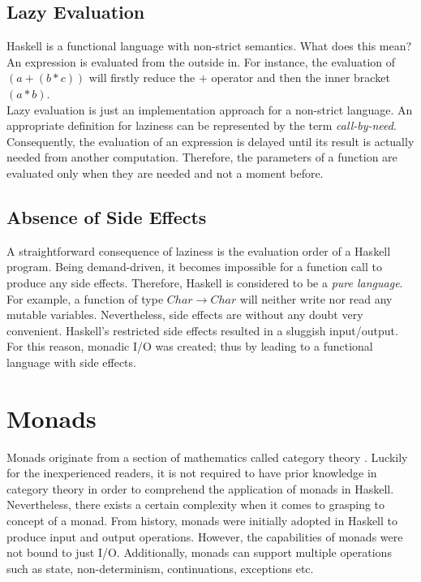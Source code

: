 \documentclass[a4paper, onecolumn]{article}
\begin{document}
    \subsection{Lazy Evaluation}
    
    Haskell is a functional language with non-strict semantics. What does this mean? An expression is evaluated from the outside in. For instance, the evaluation of \textit{$(a + (b * c))$} will firstly reduce the \textit{$+$} operator and then the inner bracket \textit{$(a * b)$}. \\
    Lazy evaluation is just an implementation approach for a non-strict language. An appropriate definition for laziness can be represented by the term \textit{call-by-need}. Consequently, the evaluation of an expression is delayed until its result is actually needed from another computation. Therefore, the parameters of a function are evaluated only when they are needed and not a moment before.
    
    \subsection{Absence of Side Effects}
    
    A straightforward consequence of laziness is the evaluation order of a Haskell program. Being demand-driven, it becomes impossible for a function call to produce any side effects. Therefore, Haskell is considered to be a \textit{pure language}. For example, a function of type $Char \rightarrow Char$ will neither write nor read any mutable variables. Nevertheless, side effects are without any doubt very convenient. Haskell's restricted side effects resulted in a sluggish input/output. For this reason, monadic I/O was created; thus by leading to a functional language with side effects. 
    \section{Monads}
    Monads originate from a section of mathematics called category theory \cite{categorytheory}. Luckily for the inexperienced readers, it is not required to have prior knowledge in category theory in order to comprehend the application of monads in Haskell. 
    Nevertheless, there exists a certain complexity when it comes to grasping to concept of a monad. From history, monads were initially adopted in Haskell to produce input and output operations. However, the capabilities of monads were not bound to just I/O. Additionally, monads can support multiple operations such as state, non-determinism, continuations, exceptions etc.
\end{document}
